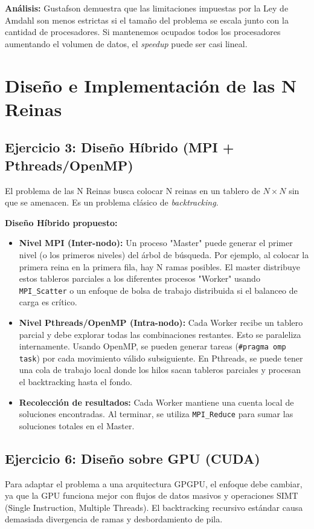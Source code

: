 \documentclass{article}
\begin{document}
\textbf{Análisis:}
Gustafson demuestra que las limitaciones impuestas por la Ley de Amdahl son menos estrictas si el tamaño del problema se escala junto con la cantidad de procesadores. Si mantenemos ocupados todos los procesadores aumentando el volumen de datos, el \textit{speedup} puede ser casi lineal.

\section{Diseño e Implementación de las N Reinas}

\subsection{Ejercicio 3: Diseño Híbrido (MPI + Pthreads/OpenMP)}
El problema de las N Reinas busca colocar N reinas en un tablero de $N \times N$ sin que se amenacen. Es un problema clásico de \textit{backtracking}.

\textbf{Diseño Híbrido propuesto:}
\begin{itemize}
    \item \textbf{Nivel MPI (Inter-nodo):} Un proceso "Master" puede generar el primer nivel (o los primeros niveles) del árbol de búsqueda. Por ejemplo, al colocar la primera reina en la primera fila, hay N ramas posibles. El master distribuye estos tableros parciales a los diferentes procesos "Worker" usando \texttt{MPI\_Scatter} o un enfoque de bolsa de trabajo distribuida si el balanceo de carga es crítico.
    \item \textbf{Nivel Pthreads/OpenMP (Intra-nodo):} Cada Worker recibe un tablero parcial y debe explorar todas las combinaciones restantes. Esto se paraleliza internamente. Usando OpenMP, se pueden generar tareas (\texttt{\#pragma omp task}) por cada movimiento válido subsiguiente. En Pthreads, se puede tener una cola de trabajo local donde los hilos sacan tableros parciales y procesan el backtracking hasta el fondo.
    \item \textbf{Recolección de resultados:} Cada Worker mantiene una cuenta local de soluciones encontradas. Al terminar, se utiliza \texttt{MPI\_Reduce} para sumar las soluciones totales en el Master.
\end{itemize}

\subsection{Ejercicio 6: Diseño sobre GPU (CUDA)}
Para adaptar el problema a una arquitectura GPGPU, el enfoque debe cambiar, ya que la GPU funciona mejor con flujos de datos masivos y operaciones SIMT (Single Instruction, Multiple Threads). El backtracking recursivo estándar causa demasiada divergencia de ramas y desbordamiento de pila.
\end{document}
